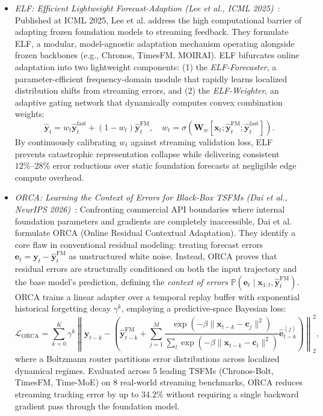 \begin{itemize}[leftmargin=*]
    \item \emph{ELF: Efficient Lightweight Forecast-Adaption (Lee et al., ICML 2025)}~\cite{lee2025elf}: Published at ICML 2025, Lee et al. address the high computational barrier of adapting frozen foundation models to streaming feedback. They formulate ELF, a modular, model-agnostic adaptation mechanism operating alongside frozen backbones (e.g., Chronos, TimesFM, MOIRAI). ELF bifurcates online adaptation into two lightweight components: (1) the \emph{ELF-Forecaster}, a parameter-efficient frequency-domain module that rapidly learns localized distribution shifts from streaming errors, and (2) the \emph{ELF-Weighter}, an adaptive gating network that dynamically computes convex combination weights:
    \begin{equation}
        \hat{\mathbf{y}}_t = w_t \hat{\mathbf{y}}_t^{\text{fast}} + (1 - w_t) \hat{\mathbf{y}}_t^{\text{FM}}, \quad w_t = \sigma\left(\mathbf{W}_w [\mathbf{x}_t; \hat{\mathbf{y}}_t^{\text{FM}}; \hat{\mathbf{y}}_t^{\text{fast}}]\right).
    \end{equation}
    By continuously calibrating $w_t$ against streaming validation loss, ELF prevents catastrophic representation collapse while delivering consistent $12\%\text{--}28\%$ error reductions over static foundation forecasts at negligible edge compute overhead.

    \item \emph{ORCA: Learning the Context of Errors for Black-Box TSFMs (Dai et al., NeurIPS 2026)}~\cite{dai2026orca}: Confronting commercial API boundaries where internal foundation parameters and gradients are completely inaccessible, Dai et al. formulate ORCA (Online Residual Contextual Adaptation). They identify a core flaw in conventional residual modeling: treating forecast errors $\mathbf{e}_t = \mathbf{y}_t - \hat{\mathbf{y}}_t^{\text{FM}}$ as unstructured white noise. Instead, ORCA proves that residual errors are structurally conditioned on both the input trajectory and the base model's prediction, defining the \emph{context of errors} $\mathbb{P}(\mathbf{e}_t \mid \mathbf{x}_{1:t}, \hat{\mathbf{y}}_t^{\text{FM}})$. ORCA trains a linear adapter over a temporal replay buffer with exponential historical forgetting decay $\gamma^k$, employing a predictive-space Bayesian loss:
    \begin{equation}
        \mathcal{L}_{\text{ORCA}} = \sum_{k=0}^K \gamma^k \left\| \mathbf{y}_{t-k} - \left(\hat{\mathbf{y}}_{t-k}^{\text{FM}} + \sum_{j=1}^M \frac{\exp(-\beta \|\mathbf{x}_{t-k} - \mathbf{c}_j\|^2)}{\sum_l \exp(-\beta \|\mathbf{x}_{t-k} - \mathbf{c}_l\|^2)} \hat{\mathbf{e}}_{t-k}^{(j)}\right) \right\|_2^2,
    \end{equation}
    where a Boltzmann router partitions error distributions across localized dynamical regimes. Evaluated across 5 leading TSFMs (Chronos-Bolt, TimesFM, Time-MoE) on 8 real-world streaming benchmarks, ORCA reduces streaming tracking error by up to $34.2\%$ without requiring a single backward gradient pass through the foundation model.


\end{itemize}
